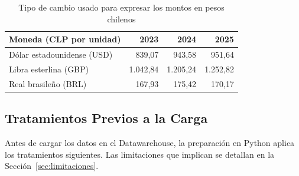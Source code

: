 \begin{table}[!htbp]
  \centering
  \caption{Tipo de cambio usado para expresar los montos en pesos chilenos}
  \label{tab:tipo_cambio}
  \small
  \begin{tabular}{@{}lrrr@{}}
    \toprule
    \textbf{Moneda (CLP por unidad)} & \textbf{2023} & \textbf{2024} & \textbf{2025} \\
    \midrule
    Dólar estadounidense (USD) & 839,07 & 943,58 & 951,64 \\
    Libra esterlina (GBP) & 1.042,84 & 1.205,24 & 1.252,82 \\
    Real brasileño (BRL) & 167,93 & 175,42 & 170,17 \\
    \bottomrule
  \end{tabular}
\end{table}

\subsection{Tratamientos Previos a la Carga}
\label{sec:tratamientos}

Antes de cargar los datos en el Datawarehouse, la preparación en Python aplica
los tratamientos siguientes. Las limitaciones que implican se detallan en la
Sección~\ref{sec:limitaciones}.

